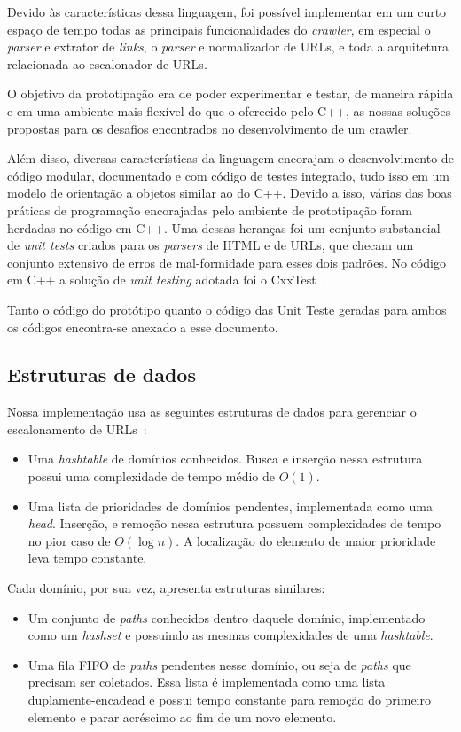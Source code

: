 \documentclass[10pt,twocolumn]{article}
\begin{document}
Devido às características dessa linguagem, foi possível implementar em
um curto espaço de tempo todas as principais funcionalidades do
\emph{crawler}, em especial o \emph{parser} e extrator de \emph{links},
o \emph{parser} e normalizador de URLs, e toda a arquitetura relacionada
ao escalonador de URLs.

O objetivo da prototipação era de poder experimentar e testar, de
maneira rápida e em uma ambiente mais flexível do que o oferecido pelo
C++, as nossas soluções propostas para os desafios encontrados no
desenvolvimento de um crawler.

Além disso, diversas características da linguagem encorajam o
desenvolvimento de código modular, documentado e com código de testes
integrado, tudo isso em um modelo de orientação a objetos
similar ao do C++. Devido a isso, várias das boas práticas de
programação encorajadas pelo ambiente de prototipação foram herdadas no
código em C++. Uma dessas heranças foi um conjunto substancial de \emph{unit
tests} criados para os
\emph{parsers} de HTML e de URLs, que checam um conjunto extensivo de
erros de mal-formidade para esses dois padrões. No código em C++ a
solução de \emph{unit testing} adotada foi o CxxTest~\cite{cxxtest}.

Tanto o código do protótipo quanto o código das Unit Teste geradas para
ambos os códigos encontra-se anexado a esse documento.

\subsection{Estruturas de dados}

Nossa implementação usa as seguintes estruturas de dados para gerenciar
o escalonamento de URLs~\cite{cormen-algorithms}:

\begin{itemize}
\item Uma \emph{hashtable} de domínios conhecidos. Busca e inserção
nessa estrutura possui uma complexidade de tempo médio de \(O\left(1 
\right)\).
\item Uma lista de prioridades de domínios pendentes, implementada como
uma \emph{head}. Inserção, e remoção nessa estrutura possuem
complexidades de tempo no pior caso de \(O\left(\log n\right)\). A
localização do elemento de maior prioridade leva tempo constante.
\end{itemize}

Cada domínio, por sua vez, apresenta estruturas similares:
\begin{itemize}
\item Um conjunto de \emph{paths} conhecidos dentro daquele domínio,
implementado como um \emph{hashset} e possuindo as mesmas complexidades
de uma \emph{hashtable}.
\item Uma fila FIFO de \emph{paths} pendentes nesse domínio, ou seja de
\emph{paths} que precisam ser coletados. Essa lista é implementada como
uma lista duplamente-encadead e possui tempo constante para remoção do
primeiro elemento e parar acréscimo ao fim de um novo elemento.
\end{itemize}
\end{document}
